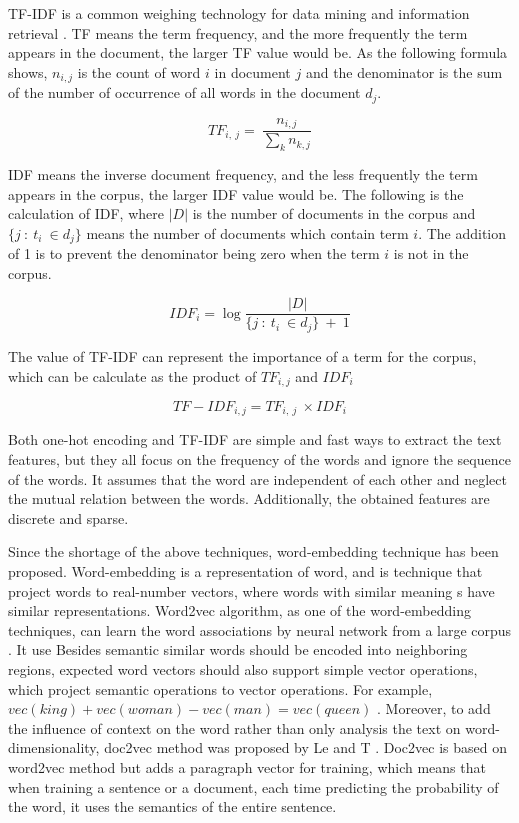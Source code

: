 TF-IDF is a common weighing technology for data mining and information retrieval \cite{mishra2015analysis}. TF means the term frequency, and the more frequently the term appears in the document, the larger TF value would be. As the following formula shows, ${n_{i,j}}$ is the count of word $i$ in document $j$ and the denominator is the sum of the number of occurrence of all words in the document ${d_{{j}}}$.

\begin{equation}
    {TF_{i,\ j}=\ \frac{n_{i,j}}{\sum_{k}n_{k,j}}}
\end{equation}

IDF means the inverse document frequency, and the less frequently the term appears in the corpus, the larger IDF value would be. The following is the calculation of IDF, where $|D|$ is the number of documents in the corpus and $\{j\ :\ t_i\ \in d_j\}$ means the number of documents which contain term $i$. The addition of 1 is to prevent the denominator being zero when the term $i$ is not in the corpus.

\begin{equation}
    IDF_i=\log{\frac{|D|}{\{j\ :\ t_i\ \in d_j\}\ +\ 1}}
\end{equation}

The value of TF-IDF can represent the importance of a term for the corpus, which can be calculate as the product of $TF_{i,j}$ and $IDF_i$

\begin{equation}
    {TF-IDF_{i,j}=TF_{i,\ j}\ \times IDF_i}
\end{equation}

Both one-hot encoding and TF-IDF are simple and fast ways to extract the text features, but they all focus on the frequency of the words and ignore the sequence of the words. It assumes that the word are independent of each other and neglect the mutual relation between the words. Additionally, the obtained features are discrete and sparse.

Since the shortage of the above techniques, word-embedding technique has been proposed. Word-embedding is a representation of word, and is technique that project words to real-number vectors, where words with similar meaning s have similar representations. Word2vec algorithm\cite{mikolov2013efficient, mikolov2013distributed}, as one of the word-embedding techniques, can learn the word associations by neural network from a large corpus \cite{enwiki:1006343323}. It use  Besides semantic similar words should be encoded into neighboring regions, expected word vectors should also support simple vector operations, which project semantic operations to vector operations. For example, $vec(king) + vec(woman) - vec(man) = vec(queen)$ \cite{church2017word2vec}. Moreover, to add the influence of context on the word rather than only analysis the text on word-dimensionality, doc2vec method was proposed by Le and T \cite{le2014distributed}. Doc2vec is based on word2vec method but adds a paragraph vector for training, which means that when training a sentence or a document, each time predicting the probability of the word, it uses the semantics of the entire sentence. 

